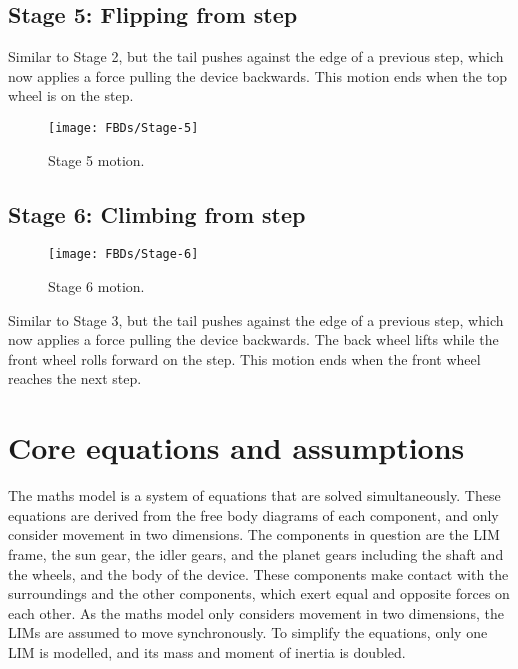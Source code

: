 \subsection*{Stage 5: Flipping from step}

Similar to Stage 2, but the tail pushes against the edge of a previous step, which now applies a force pulling the device backwards. This motion ends when the top wheel is on the step.\\
\begin{figure}[!h] %
	\centering
	\texttt{[image: FBDs/Stage-5]}
	\caption{Stage 5 motion.}
	\label{fig:stage5}
\end{figure}
\subsection*{Stage 6: Climbing from step}

\begin{wrapfigure}{r}{0.35\textwidth} %
	\centering
	\texttt{[image: FBDs/Stage-6]}
	\caption{Stage 6 motion.}
	\label{fig:stage6}
\end{wrapfigure}

Similar to Stage 3, but the tail pushes against the edge of a previous step, which now applies a force pulling the device backwards. The back wheel lifts while the front wheel rolls forward on the step. This motion ends when the front wheel reaches the next step.\\


\section{Core equations and assumptions}

The maths model is a system of equations that are solved simultaneously. These equations are derived from the free body diagrams of each component, and only consider movement in two dimensions. The components in question are the LIM frame, the sun gear, the idler gears, and the planet gears including the shaft and the wheels, and the body of the device. These components make contact with the surroundings and the other components, which exert equal and opposite forces on each other. As the maths model only considers movement in two dimensions, the LIMs are assumed to move synchronously. To simplify the equations, only one LIM is modelled, and its mass and moment of inertia is doubled.\\

